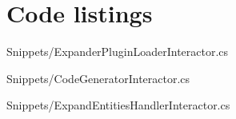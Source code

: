 \chapter{Code listings} \label{appendix_code_listings} 

 
  {Snippets/ExpanderPluginLoaderInteractor.cs}

 
  {Snippets/CodeGeneratorInteractor.cs}

 
  {Snippets/ExpandEntitiesHandlerInteractor.cs}
